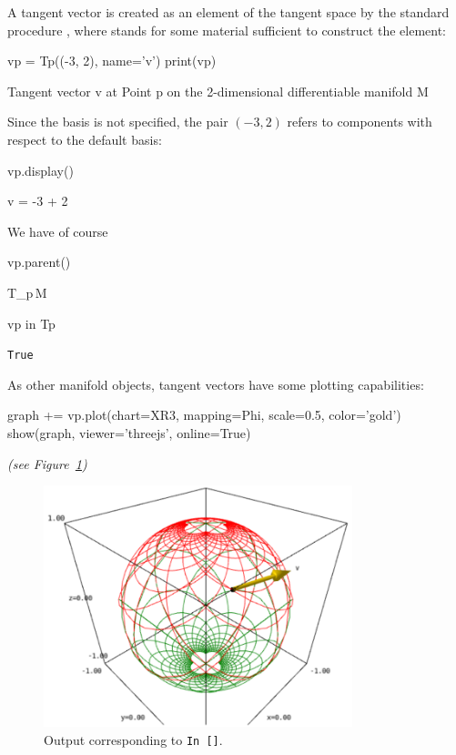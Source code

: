 A tangent vector is created as an element of the tangent space by the
standard \Sage{} procedure
, where 
stands for some material sufficient to construct the element:
\begin{NBin}
vp = Tp((-3, 2), name='v')
print(vp)
\end{NBin}
\begin{NBprint}
Tangent vector v at Point p on the 2-dimensional differentiable manifold M
\end{NBprint}
Since the basis is not specified, the pair $(-3,2)$ refers to components
with respect to the default basis:
\begin{NBin}
vp.display()
\end{NBin}
\begin{NBoutM}
v = -3  + 2 
\end{NBoutM}
We have of course
\begin{NBin}
vp.parent()
\end{NBin}
\begin{NBoutM}
T_{p}\,M
\end{NBoutM}
\vspace*{-\baselineskip}
\begin{NBin}
vp in Tp
\end{NBin}
\begin{NBout}
\texttt{True}
\end{NBout}
As other manifold objects, tangent vectors have some plotting capabilities:
\begin{NBin}
graph += vp.plot(chart=XR3, mapping=Phi, scale=0.5, color='gold')
show(graph, viewer='threejs', online=True)
\end{NBin}
\begin{NBout}
\emph{(see Figure~\ref{out2})}
\end{NBout}
\begin{figure}
\includegraphics[width=0.8\textwidth]{sphere_tan_vect.png}
\caption{Output corresponding to \texttt{In [\theNBin]}.}\label{out2}
\end{figure}

